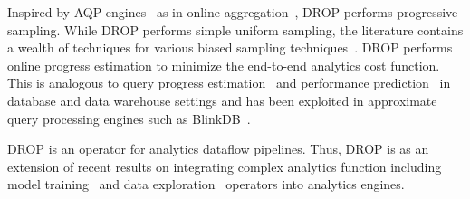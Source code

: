 
Inspired by AQP engines~\cite{barzan-keynote}
as in online aggregation~\cite{onlineagg}, DROP performs progressive
sampling.  
While DROP performs simple uniform sampling, the literature contains a wealth of techniques for various biased sampling techniques~\cite{surajit-sample, surajit-2}.
DROP performs online progress estimation to minimize the
end-to-end analytics cost function. This is analogous to query
progress estimation~\cite{qpi1} and performance
prediction~\cite{mr-predict} in database and data
warehouse settings and has been exploited in approximate query
processing engines such as BlinkDB~\cite{blinkdb}. 

 DROP is an operator
for analytics dataflow pipelines. Thus, DROP is
as an extension of recent results on integrating complex
analytics function including model training~\cite{bismarck,mcdb,mlbase} and
data exploration~\cite{scorpion,canopy,kraska-viz} operators into analytics engines. 
